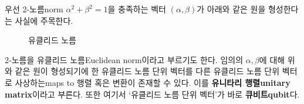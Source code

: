 \documentclass[a4paper,chapter,atbegshi]{oblivoir}
\begin{document}
우선 2-노름{\tiny norm} $\alpha^2+\beta^2=1$을 충족하는 벡터 $(\alpha,\beta)$가
아래와 같은 원을 형성한다는 사실에 주목한다. 
\begin{figure}[h]
\begin{center}
  \caption{유클리드 노름\label{fig:1-1}}
\end{center}
\end{figure}
2-노름을 유클리드 노름{\tiny Euclidean norm}이라고 부르기도 한다.
임의의 $\alpha,\beta$에 대해 위와 같은 원이 형성되기에 한 유클리드 노름 단위
벡터를 다른 유클리드 노름 단위 벡터로 사상하는{\tiny maps to} 행렬 혹은 변환이
존재할 수 있다. 이를 \textbf{유니타리 행렬\tiny unitary matrix}이라고 부른다.
또한 여기서 `유클리드 노름 단위 벡터'가 바로 \textbf{큐비트\tiny qubit}다. 
\end{document}
